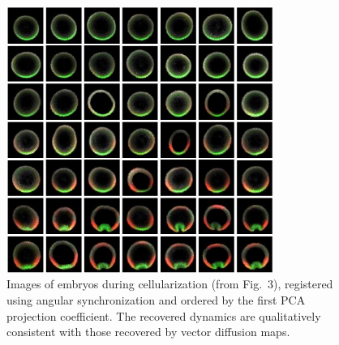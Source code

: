 \documentclass{pnastwo}
\newcommand{\fig}[0]{Fig.}
\begin{document}
\begin{figure}
\includegraphics[width=8.7cm]{PCA_ordered}
\caption{Images of embryos during cellularization (from \fig~3), registered using angular synchronization \cite{singer2011angular} and ordered by the first PCA projection coefficient. The recovered dynamics are qualitatively consistent with those recovered by vector diffusion maps. }
\label{fig:PCA_data1}
\end{figure}
\end{document}
